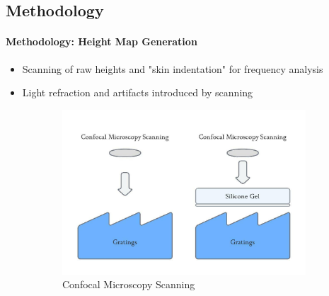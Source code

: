 \documentclass[
11pt,notheorems,hyperref={pdfauthor=whatever}
]{beamer}
\begin{document}
\subsection{Methodology}
\begin{frame}
    \framesubtitle{Methodology: Height Map Generation}
    \vspace{-10px}
    \begin{itemize}
        \item Scanning of raw heights and "skin indentation" for frequency analysis
        \item Light refraction and artifacts introduced by scanning
    \end{itemize}
    \begin{figure}
        \centering
        \begin{subfigure}[b]{0.6\textwidth}
            \centering
            \includegraphics[scale=0.9]{Neuro_Confocal.jpg}
            \caption{Confocal Microscopy Scanning}
        \end{subfigure}
        \begin{subfigure}[b]{0.28\textwidth}
            \centering

\end{subfigure}
\end{figure}
\end{frame}
\end{document}
